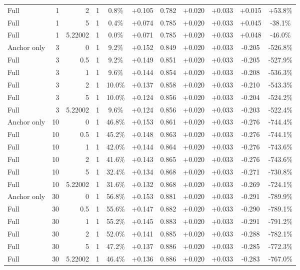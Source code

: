 \begin{table}[htbp]
\begin{tabular}{lrrrccccccc}
Full & 1 & 2 & 1 & 0.8\% & +0.105 & 0.782 & +0.020 & +0.033 & +0.015 & +53.8\% \\
Full & 1 & 5 & 1 & 0.4\% & +0.074 & 0.785 & +0.020 & +0.033 & +0.045 & -38.1\% \\
Full & 1 & 5.22002 & 1 & 0.0\% & +0.071 & 0.785 & +0.020 & +0.033 & +0.048 & -46.0\% \\
Anchor only & 3 & 0 & 1 & 9.2\% & +0.152 & 0.849 & +0.020 & +0.033 & -0.205 & -526.8\% \\
Full & 3 & 0.5 & 1 & 9.2\% & +0.149 & 0.851 & +0.020 & +0.033 & -0.205 & -527.9\% \\
Full & 3 & 1 & 1 & 9.6\% & +0.144 & 0.854 & +0.020 & +0.033 & -0.208 & -536.3\% \\
Full & 3 & 2 & 1 & 10.0\% & +0.137 & 0.858 & +0.020 & +0.033 & -0.210 & -543.3\% \\
Full & 3 & 5 & 1 & 10.0\% & +0.124 & 0.856 & +0.020 & +0.033 & -0.204 & -524.2\% \\
Full & 3 & 5.22002 & 1 & 9.6\% & +0.124 & 0.856 & +0.020 & +0.033 & -0.203 & -522.4\% \\
Anchor only & 10 & 0 & 1 & 46.8\% & +0.153 & 0.861 & +0.020 & +0.033 & -0.276 & -744.4\% \\
Full & 10 & 0.5 & 1 & 45.2\% & +0.148 & 0.863 & +0.020 & +0.033 & -0.276 & -744.1\% \\
Full & 10 & 1 & 1 & 42.0\% & +0.144 & 0.864 & +0.020 & +0.033 & -0.276 & -743.6\% \\
Full & 10 & 2 & 1 & 41.6\% & +0.143 & 0.865 & +0.020 & +0.033 & -0.276 & -743.6\% \\
Full & 10 & 5 & 1 & 32.4\% & +0.134 & 0.868 & +0.020 & +0.033 & -0.271 & -730.8\% \\
Full & 10 & 5.22002 & 1 & 31.6\% & +0.132 & 0.868 & +0.020 & +0.033 & -0.269 & -724.1\% \\
Anchor only & 30 & 0 & 1 & 56.8\% & +0.153 & 0.881 & +0.020 & +0.033 & -0.291 & -789.9\% \\
Full & 30 & 0.5 & 1 & 55.6\% & +0.147 & 0.882 & +0.020 & +0.033 & -0.290 & -789.1\% \\
Full & 30 & 1 & 1 & 55.2\% & +0.145 & 0.883 & +0.020 & +0.033 & -0.291 & -791.2\% \\
Full & 30 & 2 & 1 & 52.0\% & +0.141 & 0.885 & +0.020 & +0.033 & -0.288 & -782.1\% \\
Full & 30 & 5 & 1 & 47.2\% & +0.137 & 0.886 & +0.020 & +0.033 & -0.285 & -772.3\% \\
Full & 30 & 5.22002 & 1 & 46.4\% & +0.136 & 0.886 & +0.020 & +0.033 & -0.283 & -767.0\% \\

\end{tabular}
\end{table}
